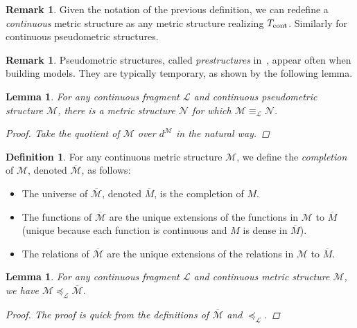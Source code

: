 \documentclass{amsart}
\newtheorem{lemma}[theorem]{Lemma}
\theoremstyle{definition}
\newtheorem{remark}[theorem]{Remark}
\newtheorem{definition}[theorem]{Definition}
\numberwithin{equation}{theorem}
\newcommand{\frag}{\mathcal{L}}
\begin{document}
\begin{remark}
  Given the notation of the previous definition, we can redefine a \emph{continuous} metric structure as any metric structure realizing ${T_\text{cont}}$.
  Similarly for continuous pseudometric structures.
\end{remark}
\begin{remark}
  Pseudometric structures, called \emph{prestructures} in~\cite{yaacov2008model}, appear often when building models.
  They are typically temporary, as shown by the following lemma.
\end{remark}
\begin{lemma}
  For any continuous fragment $\frag$ and continuous pseudometric structure $\mathcal M$, there is a metric structure $\mathcal N$ for which $\mathcal M\equiv_\frag\mathcal N$.
  \begin{proof}
    Take the quotient of $\mathcal M$ over $d^\mathcal M$ in the natural way.
  \end{proof}
\end{lemma}
\begin{definition}
  For any continuous metric structure $\mathcal M$, we define the \emph{completion} of $\mathcal M$, denoted $\overline{\mathcal M}$, as follows:
  \begin{itemize}
  \item
    The universe of $\overline{\mathcal M}$, denoted $\overline M$, is the completion of $M$.
  \item
    The functions of $\overline{\mathcal M}$ are the unique extensions of the functions in $\mathcal M$ to $\overline M$ (unique because each function is continuous and $M$ is dense in $\overline M$).
  \item
    The relations of $\overline{\mathcal M}$ are the unique extensions of the relations in $\mathcal M$ to $\overline M$.
  \end{itemize}
\end{definition}
\begin{lemma}\label{lem:completion}
  For any continuous fragment $\frag$ and continuous metric structure $\mathcal M$, we have $\mathcal M\preceq_\frag\overline{\mathcal M}$.
  \begin{proof}
    The proof is quick from the definitions of $\overline{\mathcal M}$ and $\preceq_\frag$.
  \end{proof}
\end{lemma}
\end{document}
